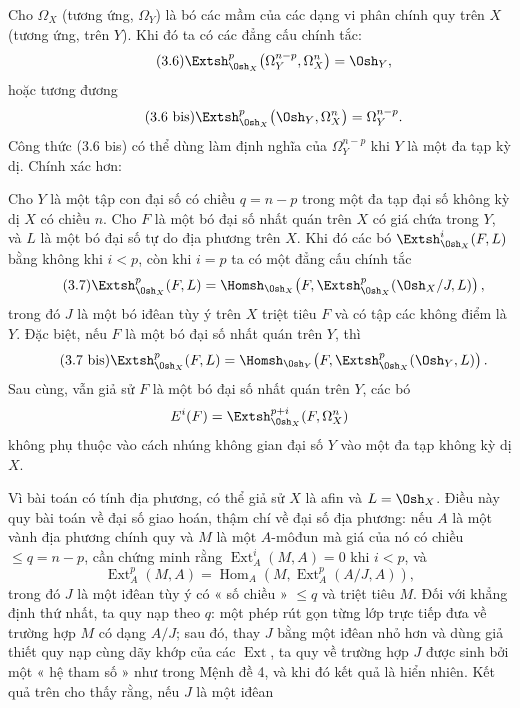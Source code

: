 Cho $\Omega_X$ (tương ứng, $\Omega_Y$) là bó các mầm của các dạng
vi phân chính quy trên $X$ (tương ứng, trên $Y$). Khi đó ta có các đẳng cấu
chính tắc:
\begin{equation}\tag{3.6}
  \Extsh_{\Osh_X}^{p}\bigl(\Omega_Y^{n-p},\Omega_X^{n}\bigr)=\Osh_Y,
\end{equation}
hoặc tương đương
\begin{equation}\tag{3.6 bis}
  \Extsh_{\Osh_X}^{p}\bigl(\Osh_Y,\Omega_X^{n}\bigr)=\Omega_Y^{n-p}.
\end{equation}
Công thức (3.6 bis) có thể dùng làm định nghĩa của $\Omega_Y^{n-p}$ khi $Y$
là một đa tạp kỳ dị. Chính xác hơn:

 Cho $Y$ là một tập con đại số có chiều
$q=n-p$ trong một đa tạp đại số không kỳ dị $X$ có chiều $n$. Cho
$F$ là một bó đại số nhất quán trên $X$ có giá chứa trong $Y$, và $L$
là một bó đại số tự do địa phương trên $X$. Khi đó các bó
$\Extsh_{\Osh_X}^{i}(F,L)$ bằng không khi $i<p$, còn khi $i=p$ ta có một
đẳng cấu chính tắc
\begin{equation}\tag{3.7}
  \Extsh_{\Osh_X}^{p}(F,L)
  =\Homsh_{\Osh_X}\!\left(F,
  \Extsh_{\Osh_X}^{p}(\Osh_X/J,L)\right),
\end{equation}
trong đó $J$ là một bó iđêan tùy ý trên $X$ triệt tiêu $F$ và có
tập các không điểm là $Y$. Đặc biệt, nếu $F$ là một bó đại số
nhất quán trên $Y$, thì
\begin{equation}\tag{3.7 bis}
  \Extsh_{\Osh_X}^{p}(F,L)
  =\Homsh_{\Osh_Y}\!\left(F,\Extsh_{\Osh_X}^{p}(\Osh_Y,L)\right).
\end{equation}
Sau cùng, vẫn giả sử $F$ là một bó đại số nhất quán trên $Y$, các bó
\[
  E^{i}(F)=\Extsh_{\Osh_X}^{p+i}(F,\Omega_X^{n})
\]
không phụ thuộc vào cách nhúng không gian đại số $Y$ vào một đa tạp
không kỳ dị $X$.

Vì bài toán có tính địa phương, có thể giả sử $X$ là afin và $L=\Osh_X$. Điều này quy
bài toán về đại số giao hoán, thậm chí về đại số địa phương: nếu $A$ là một
vành địa phương chính quy và $M$ là một $A$-môđun mà giá của nó có chiều
$\leq q=n-p$, cần chứng minh rằng $\operatorname{Ext}_{A}^{i}(M,A)=0$ khi $i<p$, và
\[
  \operatorname{Ext}_{A}^{p}(M,A)
  =\operatorname{Hom}_{A}\!\left(M,\operatorname{Ext}_{A}^{p}(A/J,A)\right),
\]
trong đó $J$ là một iđêan tùy ý có « số chiều » $\leq q$ và triệt tiêu $M$. Đối với
khẳng định thứ nhất, ta quy nạp theo $q$: một phép rút gọn từng lớp trực tiếp đưa
về trường hợp $M$ có dạng $A/J$; sau đó, thay $J$ bằng một iđêan nhỏ hơn
và dùng giả thiết quy nạp cùng dãy khớp của các
$\operatorname{Ext}$, ta quy về trường hợp $J$ được sinh bởi một « hệ tham số »
như trong Mệnh đề 4, và khi đó kết quả là hiển nhiên. Kết quả
trên cho thấy rằng, nếu $J$ là một iđêan



